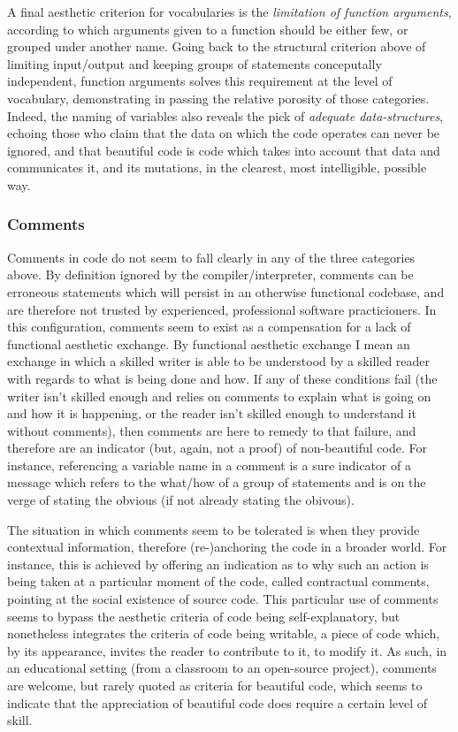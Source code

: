 A final aesthetic criterion for vocabularies is the \emph{limitation of function arguments}, according to which arguments given to a function should be either few, or grouped under another name. Going back to the structural criterion above of limiting input/output and keeping groups of statements conceputally independent, function arguments solves this requirement at the level of vocabulary, demonstrating in passing the relative porosity of those categories. Indeed, the naming of variables also reveals the pick of \emph{adequate data-structures}, echoing those who claim that the data on which the code operates can never be ignored, and that beautiful code is code which takes into account that data and communicates it, and its mutations, in the clearest, most intelligible, possible way.

\subsubsection{Comments}
\label{subsubsec:framework-comments}

Comments in code do not seem to fall clearly in any of the three categories above. By definition ignored by the compiler/interpreter, comments can be erroneous statements which will persist in an otherwise functional codebase, and are therefore not trusted by experienced, professional software practicioners. In this configuration, comments seem to exist as a compensation for a lack of functional aesthetic exchange. By functional aesthetic exchange I mean an exchange in which a skilled writer is able to be understood by a skilled reader with regards to what is being done and how. If any of these conditions fail (the writer isn't skilled enough and relies on comments to explain what is going on and how it is happening, or the reader isn't skilled enough to understand it without comments), then comments are here to remedy to that failure, and therefore are an indicator (but, again, not a proof) of non-beautiful code. For instance, referencing a variable name in a comment is a sure indicator of a message which refers to the what/how of a group of statements and is on the verge of stating the obvious (if not already stating the obivous).

The situation in which comments seem to be tolerated is when they provide contextual information, therefore (re-)anchoring the code in a broader world. For instance, this is achieved by offering an indication as to why such an action is being taken at a particular moment of the code, called contractual comments, pointing at the social existence of source code. This particular use of comments seems to bypass the aesthetic criteria of code being self-explanatory, but nonetheless integrates the criteria of code being writable, a piece of code which, by its appearance, invites the reader to contribute to it, to modify it. As such, in an educational setting (from a classroom to an open-source project), comments are welcome, but rarely quoted as criteria for beautiful code, which seems to indicate that the appreciation of beautiful code does require a certain level of skill.

